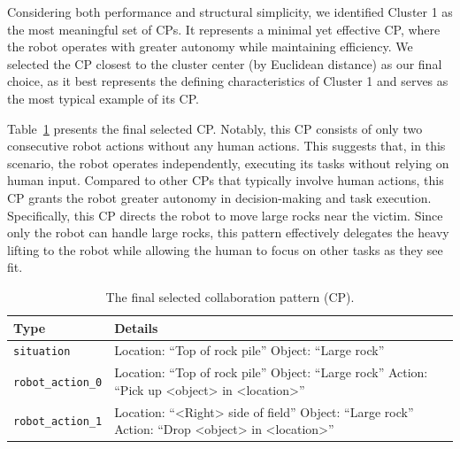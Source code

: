 \documentclass[letterpaper]{article} %
\begin{document}
Considering both performance and structural simplicity, we identified Cluster 1 as the most meaningful set of CPs. It represents a minimal yet effective CP, where the robot operates with greater autonomy while maintaining efficiency. We selected the CP closest to the cluster center (by Euclidean distance) as our final choice, as it best represents the defining characteristics of Cluster 1 and serves as the most typical example of its CP.

Table~\ref{tab:final_cp} presents the final selected CP. Notably, this CP consists of only two consecutive robot actions without any human actions. This suggests that, in this scenario, the robot operates independently, executing its tasks without relying on human input. Compared to other CPs that typically involve human actions, this CP grants the robot greater autonomy in decision-making and task execution. Specifically, this CP directs the robot to move large rocks near the victim. Since only the robot can handle large rocks, this pattern effectively delegates the heavy lifting to the robot while allowing the human to focus on other tasks as they see fit.

\begin{table}[h]
    \centering
    \renewcommand{\arraystretch}{1.2}
    \setlength{\tabcolsep}{5pt}
    \begin{tabular}{lp{5cm}}
        \toprule
        \textbf{Type} & \textbf{Details} \\
        \midrule
        \texttt{situation} & Location: ``Top of rock pile'' \newline
                   Object: ``Large rock'' \\
        \midrule
        \texttt{robot\_action\_0} & Location: ``Top of rock pile'' \newline
                         Object: ``Large rock'' \newline
                         Action: ``Pick up \textless object\textgreater{} in \textless location\textgreater{}'' \\
        \midrule
        \texttt{robot\_action\_1} & Location: ``\textless Right\textgreater{} side of field'' \newline
                         Object: ``Large rock'' \newline
                         Action: ``Drop \textless object\textgreater{} in \textless location\textgreater{}'' \\
        \bottomrule
    \end{tabular}
    \caption{The final selected collaboration pattern (CP).}
    \label{tab:final_cp}
\end{table}
\end{document}
